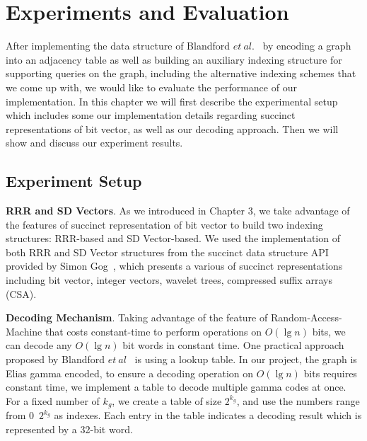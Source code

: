 \documentclass[12pt,glossary]{dalthesis}
\begin{document}
\chapter{Experiments and Evaluation}
After implementing the data structure of Blandford $et \ al.$~\cite{compact-representation} by encoding a graph into an adjacency table as well as building an auxiliary indexing structure for supporting queries on the graph, including the alternative indexing schemes that we come up with, we would like to evaluate the performance of our implementation. In this chapter we will first describe the experimental setup which includes some our implementation details regarding succinct representations of bit vector, as well as our decoding approach. Then we will show and discuss our experiment results.

\bigskip
 
\section{Experiment Setup}

\bigskip
\textbf{RRR and SD Vectors}. As we introduced in Chapter 3, we take advantage of the features of succinct representation of bit vector to build two indexing structures: RRR-based and SD Vector-based. We used the implementation of both RRR and SD Vector structures from the succinct data structure API provided by Simon Gog~\cite{sdsl}, which presents a various of succinct representations including bit vector, integer vectors, wavelet trees, compressed suffix arrays (CSA). 

\bigskip
\bigskip

\textbf{Decoding Mechanism}. Taking advantage of the feature of Random-Access-Machine that costs constant-time to perform operations on $O(\lg n)$ bits, we can decode any $O(\lg n)$ bit words in constant time. One practical approach proposed by Blandford $et \ al$~\cite{compact-representation} is using a lookup table. In our project, the graph is Elias gamma encoded, to ensure a decoding operation on $O(\lg n)$ bits requires constant time, we implement a table to decode multiple gamma codes at once. For a fixed number of $k_{g}$, we create a table of size $2^{k_{g}}$, and use the numbers range from 0~$2^{k_{g}}$ as indexes. Each entry in the table indicates a decoding result which is represented by a 32-bit word.  

\bigskip
\end{document}
